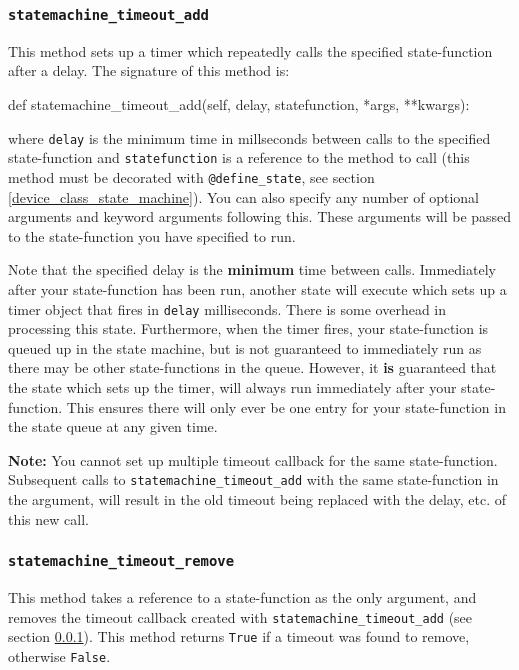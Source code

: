 \documentclass[12pt]{article}
\begin{document}
\subsubsection{\texttt{statemachine\_timeout\_add}}\label{ref:statemachine_timeout_add}
This method sets up a timer which repeatedly calls the specified state-function after a delay.
The signature of this method is:
\begin{python}
def statemachine_timeout_add(self, delay, statefunction, *args, **kwargs):
\end{python}
where \texttt{delay} is the minimum time in millseconds between calls to the specified state-function and \texttt{statefunction} is a reference to the method to call (this method must be decorated with \texttt{@define\_state}, see section \ref{device_class_state_machine}).
You can also specify any number of optional arguments and keyword arguments following this.
These arguments will be passed to the state-function you have specified to run.

Note that the specified delay is the \textbf{minimum} time between calls. 
Immediately after your state-function has been run, another state will execute which sets up a timer object that fires in \texttt{delay} milliseconds.
There is some overhead in processing this state.
Furthermore, when the timer fires, your state-function is queued up in the state machine, but is not guaranteed to immediately run as there may be other state-functions in the queue.
However, it \textbf{is} guaranteed that the state which sets up the timer, will always run immediately after your state-function.
This ensures there will only ever be one entry for your state-function in the state queue at any given time.

\textbf{Note:} You cannot set up multiple timeout callback for the same state-function. 
Subsequent calls to \texttt{statemachine\_timeout\_add} with the same state-function in the argument, will result in the old timeout being replaced with the delay, etc. of this new call.

\subsubsection{\texttt{statemachine\_timeout\_remove}}\label{ref:statemachine_timeout_remove}
This method takes a reference to a state-function as the only argument, and removes the timeout callback created with \texttt{statemachine\_timeout\_add} (see section \ref{ref:statemachine_timeout_add}).
This method returns \texttt{True} if a timeout was found to remove, otherwise \texttt{False}.
\end{document}
